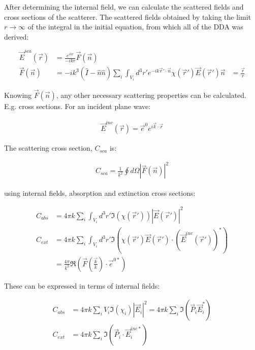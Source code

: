     After determining the internal field, we can calculate the scattered fields and cross sections of the scatterer. The
    scattered fields obtained by taking the limit $r \rightarrow \infty$ of the integral in the initial equation, from which
    all of the DDA was derived:

    \begin{align}
        \vec{E}^{sca}(\vec{r}) &= \frac{e^{ikr}}{-ikr}\vec{F}(\vec{n}) \\
        \vec{F}(\vec{n}) &= -ik^3\left(\hat{I}
                            - \hat{n}\hat{n}\right)\sum_i \int_{V_i}d^3r'e^{-ik\vec{r}'\cdot\vec{n}}\chi(\vec{r}')\vec{E}(\vec{r}')
        \vec{n} &= \frac{\vec{r}}{r}
    \end{align}

    Knowing $\vec{F}(\vec{n})$, any other necessary scattering properties can be calculated. E.g. cross sections. For
    an incident plane wave:

    \begin{align}
        \vec{E}^{inc}(\vec{r}) = \vec{e}^0 e^{i\vec{k}\cdot\vec{r}}
    \end{align}

    The scattering cross section, $C_{sca}$ is:

    \begin{align}
        C_{sca} = \frac{1}{k^2}\oint d\Omega \left|\vec{F}(\vec{n})\right|^2
    \end{align}

    using internal fields, absorption and extinction cross sections:

    \begin{align}
        C_{abs} &= 4\pi k \sum_i \int_{V_i} d^3r' \Im(\chi(\vec{r}'))\left|\vec{E}(\vec{r}')\right|^2\\
        C_{ext} &= 4\pi k \sum_i \int_{V_i} d^3r' \Im\left(\chi(\vec{r}')\vec{E}(\vec{r}')\cdot(\vec{E}^{inc}(\vec{r}'))^*\right) \\
        &= \frac{4\pi}{k^2}\Re\left(\vec{F}(\frac{\vec{k}}{k})\cdot\vec{e}^{0*}\right)
    \end{align}

    These can be expressed in terms of internal fields:

    \begin{align}
        C_{abs} &= 4\pi k \sum_i V_i \Im(\chi_i)|\vec{E}_i|^2 = 4\pi k \sum_i \Im(\vec{P}_i\vec{E}_i^*) \\
        C_{ext} &= 4\pi k \sum_i \Im (\vec{P}_i\cdot\vec{E}_i^{inc*})
    \end{align}

